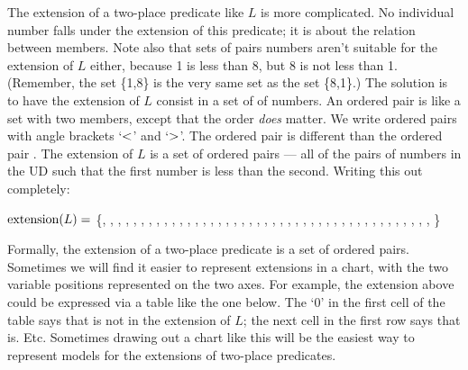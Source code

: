 The extension of a two-place predicate like $L$ is more complicated. No individual number falls under the extension of this predicate; it is about the relation between members. Note also that sets of pairs numbers aren't suitable for the extension of $L$ either, because 1 is less than 8, but 8 is not less than 1. (Remember, the set \{1,8\} is the very same set as the set \{8,1\}.) The solution is to have the extension of $L$ consist in a set of  of numbers. An ordered pair is like a set with two members, except that the order \emph{does} matter. We write ordered pairs with angle brackets `$<$' and `$>$'. The ordered pair \mbox{} is different than the ordered pair \mbox{}. The extension of $L$ is a set of ordered pairs --- all of the pairs of numbers in the UD such that the first number is less than the second. Writing this out completely:


$\mbox{extension}(L)=$ \{, , , , , , , , ,
, , , , , , , ,
, , , , , , ,
, , , , , ,
, , , , ,
, , , , 
, , ,
, 
%
\}

Formally, the extension of a two-place predicate is a set of ordered pairs. Sometimes we will find it easier to represent extensions in a chart, with the two variable positions represented on the two axes. For example, the extension above could be expressed via a table like the one below. The `0' in the first cell of the table says that  is not in the extension of $L$; the next cell in the first row says that  is. Etc. Sometimes drawing out a chart like this will be the easiest way to represent models for the extensions of two-place predicates.


